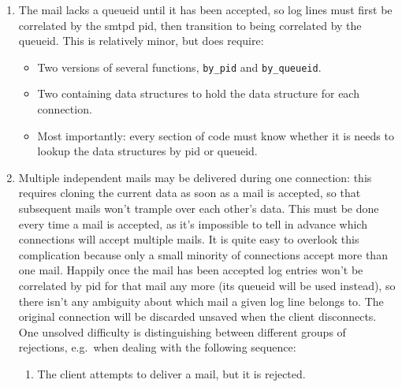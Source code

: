 \documentclass[a4paper,12pt,draft]{article}
\begin{document}
\begin{enumerate}

    \item The mail lacks a queueid until it has been accepted, so log lines
        must first be correlated by the smtpd pid, then transition to being
        correlated by the queueid.  This is relatively minor, but does
        require:

        \begin{itemize}

            \item Two versions of several functions, \texttt{by\_pid} and
                \texttt{by\_queueid}.

            \item Two containing data structures to hold the data
                structure for each connection.

            \item Most importantly: every section of code must know whether
                it is needs to lookup the data structures by pid or
                queueid.

        \end{itemize}

    \item Multiple independent mails may be delivered during one
        connection: this requires cloning the current data as soon as a
        mail is accepted, so that subsequent mails won't trample over each
        other's data.  This must be done every time a mail is accepted, as
        it's impossible to tell in advance which connections will accept
        multiple mails.  It is quite easy to overlook this complication
        because only a small minority of connections accept more than one
        mail. Happily once the mail has been accepted log entries won't be
        correlated by pid for that mail any more (its queueid will be used
        instead), so there isn't any ambiguity about which mail a given log
        line belongs to.  The original connection will be discarded unsaved
        when the client disconnects.  One unsolved difficulty is
        distinguishing between different groups of rejections, e.g.\ when
        dealing with the following sequence:

        \begin{enumerate}

            \item The client attempts to deliver a mail, but it is
                rejected.


\end{enumerate}
\end{enumerate}
\end{document}
